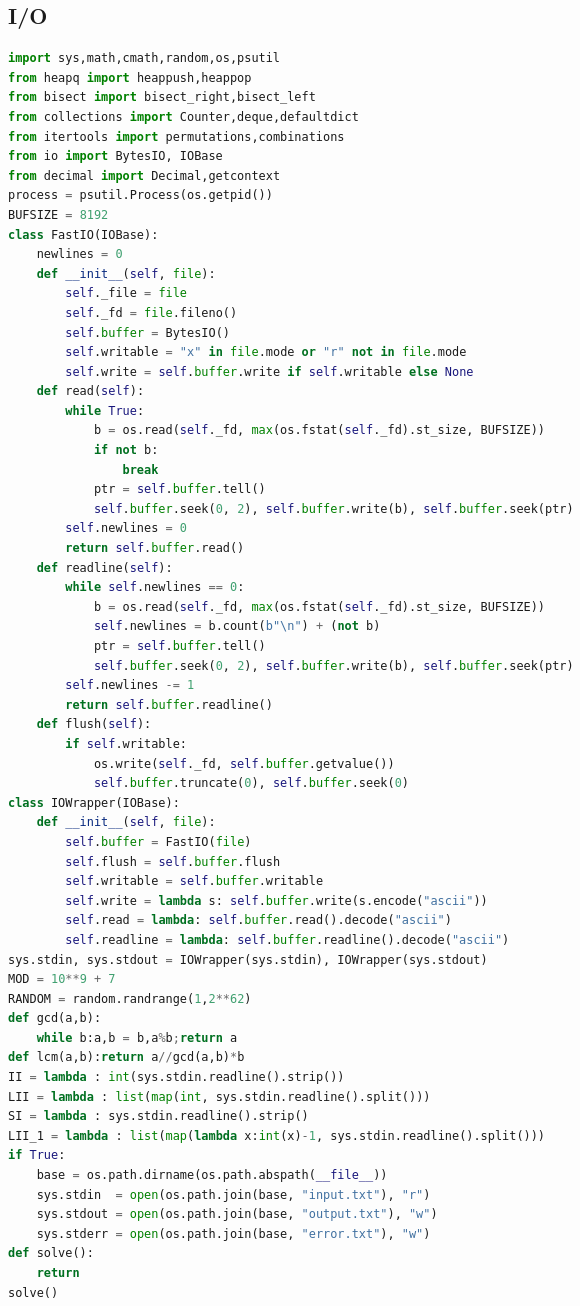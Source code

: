 \documentclass[10pt,landscape, a4paper]{article}
\begin{document}
\begin{multicols*}{3}
\section{I/O}
\begin{lstlisting}[language=Python]
import sys,math,cmath,random,os,psutil
from heapq import heappush,heappop
from bisect import bisect_right,bisect_left
from collections import Counter,deque,defaultdict
from itertools import permutations,combinations
from io import BytesIO, IOBase
from decimal import Decimal,getcontext
process = psutil.Process(os.getpid())
BUFSIZE = 8192
class FastIO(IOBase):
    newlines = 0
    def __init__(self, file):
        self._file = file
        self._fd = file.fileno()
        self.buffer = BytesIO()
        self.writable = "x" in file.mode or "r" not in file.mode
        self.write = self.buffer.write if self.writable else None
    def read(self):
        while True:
            b = os.read(self._fd, max(os.fstat(self._fd).st_size, BUFSIZE))
            if not b:
                break
            ptr = self.buffer.tell()
            self.buffer.seek(0, 2), self.buffer.write(b), self.buffer.seek(ptr)
        self.newlines = 0
        return self.buffer.read()
    def readline(self):
        while self.newlines == 0:
            b = os.read(self._fd, max(os.fstat(self._fd).st_size, BUFSIZE))
            self.newlines = b.count(b"\n") + (not b)
            ptr = self.buffer.tell()
            self.buffer.seek(0, 2), self.buffer.write(b), self.buffer.seek(ptr)
        self.newlines -= 1
        return self.buffer.readline()
    def flush(self):
        if self.writable:
            os.write(self._fd, self.buffer.getvalue())
            self.buffer.truncate(0), self.buffer.seek(0)
class IOWrapper(IOBase):
    def __init__(self, file):
        self.buffer = FastIO(file)
        self.flush = self.buffer.flush
        self.writable = self.buffer.writable
        self.write = lambda s: self.buffer.write(s.encode("ascii"))
        self.read = lambda: self.buffer.read().decode("ascii")
        self.readline = lambda: self.buffer.readline().decode("ascii")
sys.stdin, sys.stdout = IOWrapper(sys.stdin), IOWrapper(sys.stdout)
MOD = 10**9 + 7
RANDOM = random.randrange(1,2**62)
def gcd(a,b):
    while b:a,b = b,a%b;return a
def lcm(a,b):return a//gcd(a,b)*b
II = lambda : int(sys.stdin.readline().strip())
LII = lambda : list(map(int, sys.stdin.readline().split()))
SI = lambda : sys.stdin.readline().strip()
LII_1 = lambda : list(map(lambda x:int(x)-1, sys.stdin.readline().split()))
if True:
    base = os.path.dirname(os.path.abspath(__file__))
    sys.stdin  = open(os.path.join(base, "input.txt"), "r")
    sys.stdout = open(os.path.join(base, "output.txt"), "w")
    sys.stderr = open(os.path.join(base, "error.txt"), "w")
def solve():
    return
solve()
\end{lstlisting}


\end{multicols*}
\end{document}
